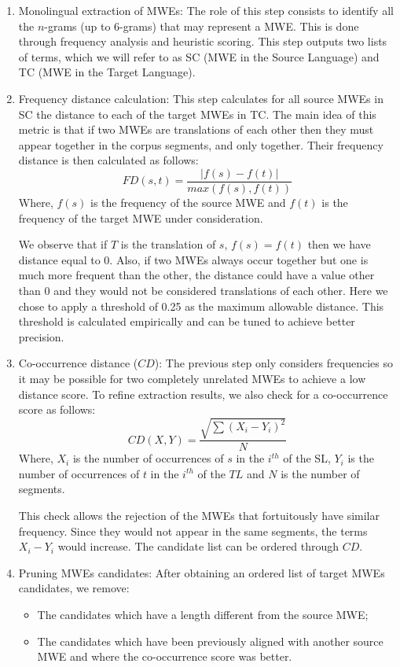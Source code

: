 \documentclass[output=paper,modfonts,nonflat]{langsci/langscibook}
\begin{document}
\begin{enumerate}
 \item Monolingual extraction of MWEs: The role of this step consists to identify all the $n$-grams (up to 6-grams) that may represent a MWE. This is done through frequency analysis and heuristic scoring. This step outputs two lists of terms, which we will refer to as SC (MWE in the Source Language) and TC (MWE in the Target Language).
 \item Frequency distance calculation: This step calculates for all source MWEs in SC the distance to each of the target MWEs in TC. The main idea of this metric is that if two MWEs are translations of each other then they must appear together in the corpus segments, and only together. Their frequency distance is then calculated as follows:
 \begin{equation}
  FD(s,t)=\frac{|f(s)-f(t)|}{max(f(s),f(t))}
 \end{equation}
 Where, $f(s)$ is the frequency of the source MWE and $f(t)$ is the frequency of the target MWE under consideration.

We observe that if $T$ is the translation of $s$, $f(s) = f(t) $ then we have distance equal to 0. 
Also, if two MWEs always occur together but one is much more frequent than the other, the distance could have a value other than 0 and they would not be considered translations of each other. 
Here we chose to apply a threshold of 0.25 as the maximum allowable distance. This threshold is calculated empirically and can be tuned to achieve better precision.

\item Co-occurrence distance ($CD$): The previous step only considers frequencies so it may be possible for two completely unrelated MWEs to achieve a low distance score. To refine extraction results, we also check for a co-occurrence score as follows:
\begin{equation}
  CD(X,Y)=\frac{\sqrt{\sum(X_i-Y_i)^2}}{N}
\end{equation}
Where, $X_i$ is the number of occurrences of $s$ in the $i^{th}$  of the SL, $Y_i$ is the number of occurrences of $t$ in the $i^{th}$  of the $TL$ and $N$ is the number of segments.

This check allows the rejection of the MWEs that fortuitously have similar frequency. Since they would not appear in the same segments, the terms $X_i-Y_i$ would increase. The candidate list can be ordered through $CD$.

\item Pruning MWEs candidates: After obtaining an ordered list of target MWEs candidates, we remove:
\begin{itemize}
 \item The candidates which have a length different from the source MWE;
 \item The candidates which have been previously aligned with another source MWE and where the co-occurrence score was better.
\end{itemize}
\end{enumerate}
\end{document}
